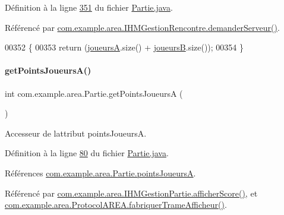Définition à la ligne \hyperlink{_partie_8java_source_l00351}{351} du fichier \hyperlink{_partie_8java_source}{Partie.\+java}.



Référencé par \hyperlink{_i_h_m_gestion_rencontre_8java_source_l00222}{com.\+example.\+area.\+I\+H\+M\+Gestion\+Rencontre.\+demander\+Serveur()}.


\begin{DoxyCode}
00352     \{
00353         \textcolor{keywordflow}{return} (\hyperlink{classcom_1_1example_1_1area_1_1_partie_a190a033a96ec435589ac53f78d60890b}{joueursA}.size() + \hyperlink{classcom_1_1example_1_1area_1_1_partie_a208910b83df461c3a2503f3b28650ce8}{joueursB}.size());
00354     \}
\end{DoxyCode}
\mbox{\label{classcom_1_1example_1_1area_1_1_partie_a5ec15306fc24648c1698ea0cdd50bf53}} 
\paragraph{\texorpdfstring{get\+Points\+Joueurs\+A()}{getPointsJoueursA()}}
{\footnotesize\ttfamily int com.\+example.\+area.\+Partie.\+get\+Points\+JoueursA (\begin{DoxyParamCaption}{ }\end{DoxyParamCaption})}



Accesseur de l\textquotesingle{}attribut points\+JoueursA. 



Définition à la ligne \hyperlink{_partie_8java_source_l00080}{80} du fichier \hyperlink{_partie_8java_source}{Partie.\+java}.



Références \hyperlink{_partie_8java_source_l00039}{com.\+example.\+area.\+Partie.\+points\+JoueursA}.



Référencé par \hyperlink{_i_h_m_gestion_partie_8java_source_l00435}{com.\+example.\+area.\+I\+H\+M\+Gestion\+Partie.\+afficher\+Score()}, et \hyperlink{_protocol_a_r_e_a_8java_source_l00048}{com.\+example.\+area.\+Protocol\+A\+R\+E\+A.\+fabriquer\+Trame\+Afficheur()}.


